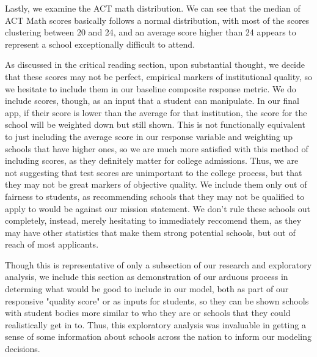 \documentclass{article}\usepackage[]{graphicx}\usepackage[]{color}
\begin{document}
Lastly, we examine the ACT math distribution. We can see that the median of ACT Math scores basically follows a normal distribution, with most of the scores clustering between 20 and 24, and an average score higher than 24 appears to represent a school exceptionally difficult to attend.\newline

As discussed in the critical reading section, upon substantial thought, we decide that these scores may not be perfect, empirical markers of institutional quality, so we hesitate to include them in our baseline composite response metric. We do include scores, though, as an input that a student can manipulate. In our final app, if their score is lower than the average for that institution, the score for the school will be weighted down but still shown. This is not functionally equivalent to just including the average score in our response variable and weighting up schools that have higher ones, so we are much more satisfied with this method of including scores, as they definitely matter for college admissions. Thus, we are not suggesting that test scores are unimportant to the college process, but that they may not be great markers of objective quality. We include them only out of fairness to students, as recommending schools that they may not be qualified to apply to would be against our mission statement. We don't rule these schools out completely, instead, merely hesitating to immediately reccomend them, as they may have other statistics that make them strong potential schools, but out of reach of most applicants.\newline

Though this is representative of only a subsection of our research and exploratory analysis, we include this section as demonstration of our arduous process in determing what would be good to include in our model, both as part of our responsive "quality score" or as inputs for students, so they can be shown schools with student bodies more similar to who they are or schools that they could realistically get in to. Thus, this exploratory analysis was invaluable in getting a sense of some information about schools across the nation to inform our modeling decisions. \newline
\end{document}
